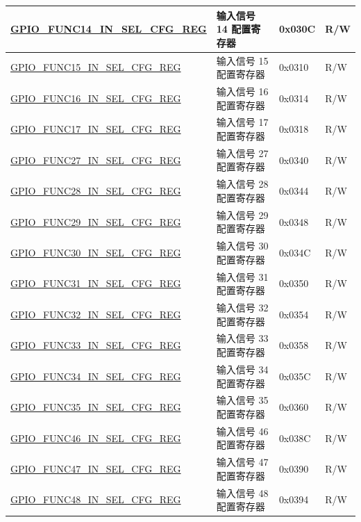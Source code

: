 \begin{longtable}{ | p{6cm} | p{7.2cm} | p{1.3cm} | p{1cm} | }
\hyperref[regdesc:GPIOFUNCMINSELCFGREG]{GPIO\_FUNC14\_IN\_SEL\_CFG\_REG} & 输入信号 14 配置寄存器 & 0x030C & R/W \\ \hline
\hyperref[regdesc:GPIOFUNCMINSELCFGREG]{GPIO\_FUNC15\_IN\_SEL\_CFG\_REG} & 输入信号 15 配置寄存器 & 0x0310 & R/W \\ \hline
\hyperref[regdesc:GPIOFUNCMINSELCFGREG]{GPIO\_FUNC16\_IN\_SEL\_CFG\_REG} & 输入信号 16 配置寄存器 & 0x0314 & R/W \\ \hline
\hyperref[regdesc:GPIOFUNCMINSELCFGREG]{GPIO\_FUNC17\_IN\_SEL\_CFG\_REG} & 输入信号 17 配置寄存器 & 0x0318 & R/W \\ \hline
\hyperref[regdesc:GPIOFUNCPINSELCFGREG]{GPIO\_FUNC27\_IN\_SEL\_CFG\_REG} & 输入信号 27 配置寄存器 & 0x0340 & R/W \\ \hline
\hyperref[regdesc:GPIOFUNCPINSELCFGREG]{GPIO\_FUNC28\_IN\_SEL\_CFG\_REG} & 输入信号 28 配置寄存器 & 0x0344 & R/W \\ \hline
\hyperref[regdesc:GPIOFUNCPINSELCFGREG]{GPIO\_FUNC29\_IN\_SEL\_CFG\_REG} & 输入信号 29 配置寄存器 & 0x0348 & R/W \\ \hline
\hyperref[regdesc:GPIOFUNCPINSELCFGREG]{GPIO\_FUNC30\_IN\_SEL\_CFG\_REG} & 输入信号 30 配置寄存器 & 0x034C & R/W \\ \hline
\hyperref[regdesc:GPIOFUNCPINSELCFGREG]{GPIO\_FUNC31\_IN\_SEL\_CFG\_REG} & 输入信号 31 配置寄存器 & 0x0350 & R/W \\ \hline
\hyperref[regdesc:GPIOFUNCPINSELCFGREG]{GPIO\_FUNC32\_IN\_SEL\_CFG\_REG} & 输入信号 32 配置寄存器 & 0x0354 & R/W \\ \hline
\hyperref[regdesc:GPIOFUNCPINSELCFGREG]{GPIO\_FUNC33\_IN\_SEL\_CFG\_REG} & 输入信号 33 配置寄存器 & 0x0358 & R/W \\ \hline
\hyperref[regdesc:GPIOFUNCPINSELCFGREG]{GPIO\_FUNC34\_IN\_SEL\_CFG\_REG} & 输入信号 34 配置寄存器 & 0x035C & R/W \\ \hline
\hyperref[regdesc:GPIOFUNCPINSELCFGREG]{GPIO\_FUNC35\_IN\_SEL\_CFG\_REG} & 输入信号 35 配置寄存器 & 0x0360 & R/W \\ \hline
\hyperref[regdesc:GPIOFUNCRINSELCFGREG]{GPIO\_FUNC46\_IN\_SEL\_CFG\_REG} & 输入信号 46 配置寄存器 & 0x038C & R/W \\ \hline
\hyperref[regdesc:GPIOFUNCRINSELCFGREG]{GPIO\_FUNC47\_IN\_SEL\_CFG\_REG} & 输入信号 47 配置寄存器 & 0x0390 & R/W \\ \hline
\hyperref[regdesc:GPIOFUNCRINSELCFGREG]{GPIO\_FUNC48\_IN\_SEL\_CFG\_REG} & 输入信号 48 配置寄存器 & 0x0394 & R/W \\ \hline

\end{longtable}
